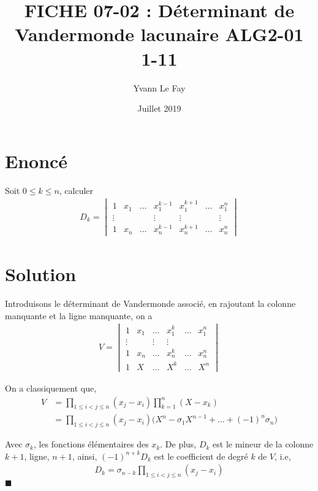 \documentclass{article}
\newcommand*{\QED}{\hfill\ensuremath{\blacksquare}}%
\begin{document}
\title{FICHE 07-02 : Déterminant de Vandermonde lacunaire ALG2-01 1-11}
\author{Yvann Le Fay}
\date{Juillet 2019}
\maketitle
\section*{Enoncé}
Soit $0\leq k\leq n$, calculer
\begin{align*}
D_k = 
\begin{vmatrix}
1 & x_1 & \ldots & x_1^{k-1} & x_1^{k+1}& \ldots & x_1^n\\
\vdots & & & \vdots& \vdots & & \vdots\\
1 & x_n & \ldots & x_n^{k-1} & x_n^{k+1}& \ldots & x_n^n
\end{vmatrix}
\end{align*}

\section*{Solution}
Introduisons le déterminant de Vandermonde associé, en rajoutant la colonne manquante et la ligne manquante, on a
\begin{align*}
V = \begin{vmatrix}
1 & x_1 & \ldots & x_1^k & \ldots & x_1^n\\
\vdots & & \vdots& \vdots\\
1 & x_n & \ldots &x_n^k&  \ldots & x_n^n\\
1 & X &\ldots &X^k&\ldots &X^n
\end{vmatrix}
\end{align*} 

On a classiquement que, 
\begin{align*}
V &= \prod_{1\leq i<j\leq n}(x_j-x_i)\prod_{k=1}^n (X-x_k)\\
&=\prod_{1\leq i<j\leq n}(x_j-x_i)\bigg(X^n -\sigma_1 X^{n-1}+\ldots+(-1)^n \sigma_n\bigg)
\end{align*}

Avec $\sigma_k$, les fonctions élémentaires des $x_k$. 
De plus, $D_k$ est le mineur de la colonne $k+1$, ligne, $n+1$, ainsi, $(-1)^{n+k}D_k$ est le coefficient de degré $k$ de $V$, i.e, 
\begin{align*}
D_k = \sigma_{n-k} \prod_{1\leq i<j\leq n}(x_j-x_i)
\end{align*}
\QED
\end{document}
